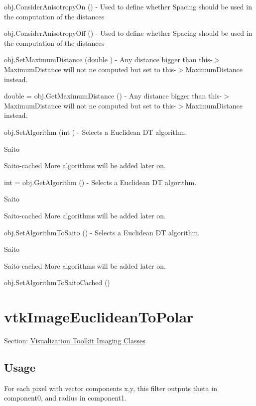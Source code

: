 \begin{DoxyItemize}
\item {\ttfamily obj.\-Consider\-Anisotropy\-On ()} -\/ Used to define whether Spacing should be used in the computation of the distances  
\item {\ttfamily obj.\-Consider\-Anisotropy\-Off ()} -\/ Used to define whether Spacing should be used in the computation of the distances  
\item {\ttfamily obj.\-Set\-Maximum\-Distance (double )} -\/ Any distance bigger than this-\/$>$Maximum\-Distance will not ne computed but set to this-\/$>$Maximum\-Distance instead.  
\item {\ttfamily double = obj.\-Get\-Maximum\-Distance ()} -\/ Any distance bigger than this-\/$>$Maximum\-Distance will not ne computed but set to this-\/$>$Maximum\-Distance instead.  
\item {\ttfamily obj.\-Set\-Algorithm (int )} -\/ Selects a Euclidean D\-T algorithm.
\begin{DoxyEnumerate}
\item Saito
\item Saito-\/cached More algorithms will be added later on.  
\end{DoxyEnumerate}
\item {\ttfamily int = obj.\-Get\-Algorithm ()} -\/ Selects a Euclidean D\-T algorithm.
\begin{DoxyEnumerate}
\item Saito
\item Saito-\/cached More algorithms will be added later on.  
\end{DoxyEnumerate}
\item {\ttfamily obj.\-Set\-Algorithm\-To\-Saito ()} -\/ Selects a Euclidean D\-T algorithm.
\begin{DoxyEnumerate}
\item Saito
\item Saito-\/cached More algorithms will be added later on.  
\end{DoxyEnumerate}
\item {\ttfamily obj.\-Set\-Algorithm\-To\-Saito\-Cached ()}  
\end{DoxyItemize}\hypertarget{vtkimaging_vtkimageeuclideantopolar}{}\section{vtk\-Image\-Euclidean\-To\-Polar}\label{vtkimaging_vtkimageeuclideantopolar}
Section\-: \hyperlink{sec_vtkimaging}{Visualization Toolkit Imaging Classes} \hypertarget{vtkwidgets_vtkxyplotwidget_Usage}{}\subsection{Usage}\label{vtkwidgets_vtkxyplotwidget_Usage}
For each pixel with vector components x,y, this filter outputs theta in component0, and radius in component1.

